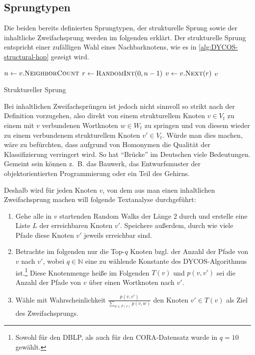 \subsection{Sprungtypen}\label{sec:sprungtypen}
Die beiden bereits definierten Sprungtypen, der strukturelle Sprung sowie der
inhaltliche Zweifachsprung werden im folgenden erklärt.
\goodbreak
Der strukturelle Sprung entspricht einer zufälligen Wahl eines Nachbarknotens,
wie es in \cref{alg:DYCOS-structural-hop} gezeigt wird.
\begin{algorithm}[H]
    \begin{algorithmic}[1]
            \State $n \gets v.\Call{NeighborCount}{}$ 
            \State $r \gets \Call{RandomInt}{0, n-1}$ 
            \State $v \gets v.\Call{Next}{r}$ 
            \State \Return $v$
        \EndProcedure
    \end{algorithmic}
\caption{Struktureller Sprung}
\label{alg:DYCOS-structural-hop}
\end{algorithm}

Bei inhaltlichen Zweifachsprüngen ist jedoch nicht sinnvoll so strikt nach der
Definition vorzugehen,  also direkt von einem strukturellem Knoten $v \in V_t$
zu einem mit $v$ verbundenen Wortknoten $w \in W_t$ zu springen und von diesem
wieder zu einem verbundenem strukturellem Knoten $v' \in V_t$. Würde man dies
machen, wäre zu befürchten, dass aufgrund von Homonymen die Qualität der
Klassifizierung verringert wird. So hat \enquote{Brücke} im Deutschen viele
Bedeutungen. Gemeint sein können z.~B. das Bauwerk, das Entwurfsmuster der
objektorientierten Programmierung oder ein Teil des Gehirns.

Deshalb wird für jeden Knoten $v$, von dem aus man einen inhaltlichen
Zweifachsprung machen will folgende Textanalyse durchgeführt:
\begin{enumerate}[label=C\arabic*,ref=C\arabic*]
    \item \label{step:c1} Gehe alle in $v$ startenden Random Walks der Länge $2$ durch
          und erstelle eine Liste $L$ der erreichbaren Knoten $v'$. Speichere
          außerdem, durch wie viele Pfade diese Knoten $v'$ jeweils erreichbar
          sind.
    \item \label{step:c2} Betrachte im folgenden nur die Top-$q$ Knoten bzgl. der
          Anzahl der Pfade von $v$ nach $v'$, wobei $q \in \mathbb{N}$
          eine zu wählende Konstante des DYCOS-Algorithmus ist.\footnote{Sowohl für den DBLP, als auch für den
CORA-Datensatz wurde in \cite[S. 364]{aggarwal2011} $q=10$ gewählt.}
          Diese Knotenmenge heiße im Folgenden $T(v)$ und $p(v, v')$ sei die
          Anzahl der Pfade von $v$ über einen Wortknoten nach $v'$.
    \item \label{step:c3} Wähle mit Wahrscheinlichkeit $\frac{p(v, v')}{\sum_{w \in T(v)} p(v, w)}$
          den Knoten $v' \in T(v)$ als Ziel des Zweifachsprungs.
\end{enumerate}

